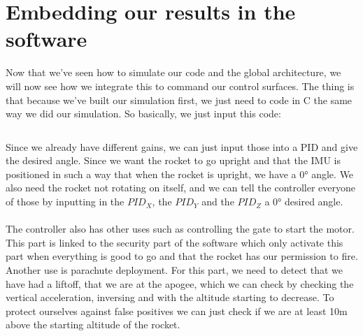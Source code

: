 \section{Embedding our results in the software}

Now that we've seen how to simulate our code and the global architecture, we
will now see how we integrate this to command our control surfaces. The thing
is that because we've built our simulation first, we just need to code in C
the same way we did our simulation. So basically, we just input this code:

\inputminted[linenos, firstline=1, lastline=29]{c}{\RawCode/code.c}

Since we already have different gains, we can just input those into a PID
and give the desired angle. Since we want the rocket to go upright and that
the IMU is positioned in such a way that when the rocket is upright, we have
a $0 \si{\degree}$ angle. We also need the rocket not rotating on itself, and
we can tell the controller everyone of those by inputting in the $PID_X$,
the $PID_Y$ and the $PID_Z$ a $0 \si{\degree}$ desired angle.

\paragraph{}
The controller also has other uses such as controlling the gate to start the
motor. This part is linked to the security part of the software which only
activate this part when everything is good to go and that the rocket has our
permission to fire.
Another use is parachute deployment. For this part, we need to detect that
we have had a liftoff, that we are at the apogee, which we can check by
checking the vertical acceleration, inversing and with the altitude starting
to decrease. To protect ourselves against false positives we can just check
if we are at least 10m above the starting altitude of the rocket.
